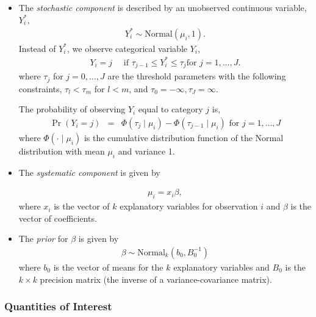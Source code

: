 \begin{itemize}
\item The \emph{stochastic component} is described by an unobserved 
continuous variable, $Y_i^*$, 
\begin{eqnarray*}
Y_{i}^*  \sim \textrm{Normal}(\mu_i, 1).
\end{eqnarray*}
Instead of $Y_i^*$, we observe categorical variable $Y_i$,
\begin{eqnarray*}
Y_i = j \quad \textrm{ if } \tau_{j-1} \le Y_i^* \le \tau_j \textrm{
for } j=1,\ldots, J.
\end{eqnarray*}
where $\tau_j$ for $j=0,\ldots, J$ are the threshold parameters with
the following constraints, $\tau_l < \tau_m$ for $l < m$, and
$\tau_0=-\infty, \tau_J=\infty$.

The probability of observing $Y_i$ equal to category $j$ is,
\begin{eqnarray*}
\Pr(Y_i=j) &=& \Phi(\tau_j \mid \mu_i)-\Phi(\tau_{j-1} \mid \mu_i) 
\textrm{ for } j=1,\ldots, J
\end{eqnarray*}
where $\Phi(\cdot \mid \mu_i)$ is the cumulative distribution function
of the Normal distribution with mean $\mu_i$ and variance 1.

\item The \emph{systematic component} is given by

\begin{eqnarray*}
\mu_{i}= x_i \beta,
\end{eqnarray*}
where $x_{i}$ is the vector of $k$ explanatory variables for 
observation $i$ and $\beta$ is the vector of coefficients.

\item The \emph{prior} for $\beta$ is given by
\begin{eqnarray*}
\beta \sim \textrm{Normal}_k\left(  b_{0},B_{0}^{-1}\right)
\end{eqnarray*}
where $b_{0}$ is the vector of means for the $k$ explanatory variables
and $B_{0}$ is the $k \times k$ precision matrix (the inverse of a
variance-covariance matrix).
\end{itemize}

\subsubsection{Quantities of Interest}

